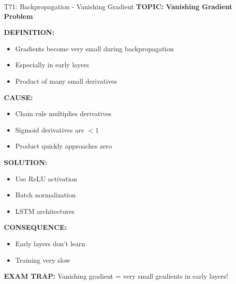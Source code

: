 \documentclass[8pt]{beamer}
\begin{document}
	\begin{frame}{T71: Backpropagation - Vanishing Gradient}
		\fontsize{6.5}{7.5}\selectfont
		\textbf{TOPIC: Vanishing Gradient Problem}
		
		\vspace{0.1cm}
		\textbf{DEFINITION:}
		\begin{itemize}
			\item Gradients become very small during backpropagation
			\item Especially in early layers
			\item Product of many small derivatives
		\end{itemize}
		
		\vspace{0.1cm}
		\textbf{CAUSE:}
		\begin{itemize}
			\item Chain rule multiplies derivatives
			\item Sigmoid derivatives are $<1$
			\item Product quickly approaches zero
		\end{itemize}
		
		\vspace{0.1cm}
		\textbf{SOLUTION:}
		\begin{itemize}
			\item Use ReLU activation
			\item Batch normalization
			\item LSTM architectures
		\end{itemize}
		
		\vspace{0.1cm}
		\textbf{CONSEQUENCE:}
		\begin{itemize}
			\item Early layers don't learn
			\item Training very slow
		\end{itemize}
		
		\textcolor{myred}{\textbf{EXAM TRAP:}} Vanishing gradient = \textcolor{myblue}{very small gradients} in early layers!
	\end{frame}
	
\end{document}
